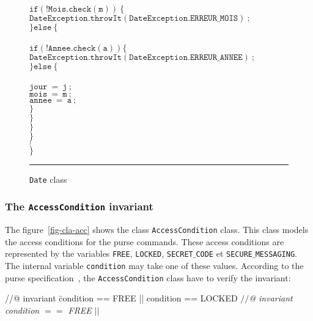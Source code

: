 \begin{center}
\begin{figure}[hbt]
\begin{tabbing}
\>\> \\
\>\>\>$\mathtt{if(!Mois.check(m))\ \{}$\\
\>\>\>\>$\mathtt{DateException.throwIt(DateException.ERREUR\_MOIS)\ ;}$ \\
\>\>\>$\mathtt{\}else\ \{}$ \\
\>\>\> \\
\>\>\>\>$\mathtt{if(!Annee.check(a)) \{}$ \\
\>\>\>\>\>$\mathtt{DateException.throwIt(DateException.ERREUR\_ANNEE)\ ;}$ \\
\>\>\>\>$\mathtt{\}else\ \{}$ \\
\>\>\>\> \\
\>\>\>\>\>$\mathtt{jour\ =\ j\ ;} $\\
\>\>\>\>\>$\mathtt{mois\ =\ m\ ;} $\\
\>\>\>\>\>$\mathtt{annee\ =\ a\ ;} $\\
\>\>\>\>$\mathtt{\}}$ \\
\>\>\>$\mathtt{\}} $\\
\>\>$\mathtt{\}} $\\
\>$\mathtt{\}} $\\
\>$\vdots$ \\
$\mathtt{\}}$ \\
\end{tabbing}
\caption{{\tt Date} class}
\label{fig-cla-dat}
\rule{\linewidth}{0.3mm}
\end{figure}
\end{center}


\subsubsection{The {\tt \bf AccessCondition} invariant}
The figure~\ref{fig-cla-acc} shows the class \texttt{AccessCondition}
class. This class models the access conditions for the purse
commands. These access conditions are represented by the variables
\texttt{FREE}, \texttt{LOCKED}, \texttt{SECRET$\_$CODE} et
\texttt{SECURE$\_$MESSAGING}. The internal variable \texttt{condition} 
may take one of these values. According to the purse
specification~\cite{BMGL00}, the \texttt{AccessCondition} class have
to verify the invariant$:$ \\

\begin{tabbing}
//@ invariant \=condition == FREE || condition == LOCKED \kill
{\it $\slash\slash$@ invariant condition $==$ FREE $||$} \\
 \\
 \\
 \\
 \\
\end{tabbing}

